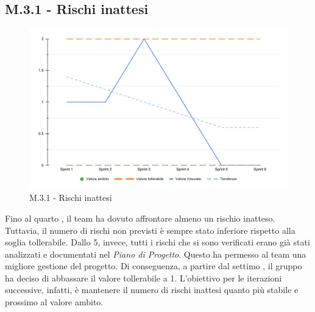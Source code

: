 \subsection{M.3.1 - Rischi inattesi}
\begin{figure}[H]
    \centering
    \includegraphics[width=\textwidth]{assets/rischi_inattesi.pdf}
    \caption{M.3.1 - Rischi inattesi}
\end{figure}

\par Fino al quarto , il team ha dovuto affrontare almeno un rischio inatteso. Tuttavia, il numero di rischi non previsti è sempre stato inferiore rispetto alla soglia tollerabile. Dallo  5, invece, tutti i rischi che si sono verificati erano già stati analizzati e documentati nel \textit{Piano di Progetto}. Questo ha permesso al team una migliore gestione del progetto. Di conseguenza, a partire dal settimo , il gruppo ha deciso di abbassare il valore tollerabile a 1. L'obiettivo per le iterazioni successive, infatti, è mantenere il numero di rischi inattesi quanto più stabile e prossimo al valore ambito.